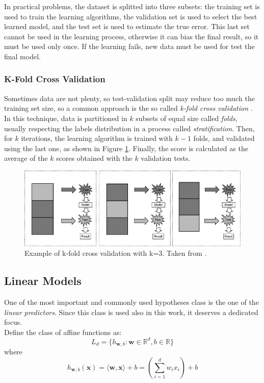 In practical problems, the dataset is splitted into three subsets: the training set is used to train the learning algorithms, the validation set is used to select the best learned model, and the test set is used to estimate the true error. This last set cannot be used in the learning process, otherwise it can bias the final result, so it must be used only once. If the learning fails, new data must be used for test the final model.


\subsubsection{K-Fold Cross Validation}
Sometimes data are not plenty, so test-validation split may reduce too much the training set size, so a common approach is the so called \textit{k-fold cross validation} \cite{Refaeilzadeh2009}. In this technique, data is partitioned in $k$ subsets of equal size called \textit{folds}, usually respecting the labels distribution in a process called \textit{stratification}. Then, for $k$ iterations, the learning algorithm is trained with $k-1$ folds, and validated using the last one, as shown in Figure \ref{fig:kfold}. Finally, the score is calculated as the average of the $k$ scores obtained with the $k$ validation tests. 

\begin{figure}[ht]
	\centering
	\includegraphics[width=1\textwidth]{figures/kfold.jpg}
	\caption{Example of k-fold cross validation with k=3. Taken from \cite{Refaeilzadeh2009}.}
	\label{fig:kfold}
\end{figure}


\subsection{Linear Models}
One of the most important and commonly used hypotheses class is the one of the \textit{linear predictors}. Since this class is used also in this work, it deserves a dedicated focus.\\
Define the class of affine functions as:
\[ L_d = \{h_{\textbf{w},b} : \mathbf{w} \in \mathbb{R}^d, b \in \mathbb{R} \} \]
where
\[ h_{\mathbf{w}, b}(\mathbf{x}) = \langle \mathbf{w},\mathbf{x} \rangle + b = \left( \sum_{i=1}^{d} w_i x_i \right) + b \]

